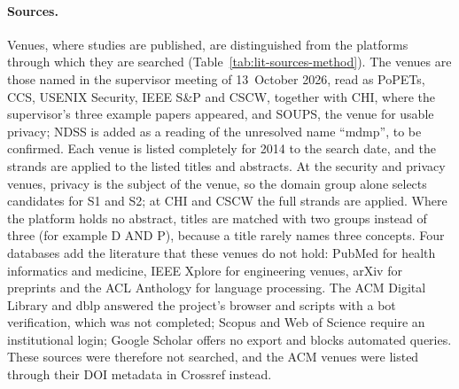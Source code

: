\paragraph{Sources.} Venues, where studies are published, are distinguished from
the platforms through which they are searched (Table~\ref{tab:lit-sources-method}).
The venues are those named in the supervisor meeting of 13~October 2026, read
as PoPETs, CCS, USENIX Security, IEEE S\&P and CSCW, together with CHI, where
the supervisor's three example papers appeared, and SOUPS, the venue for usable
privacy; NDSS is added as a reading of the unresolved name \enquote{mdmp}, to be
confirmed. Each venue is listed completely for 2014 to the search date, and the
strands are applied to the listed titles and abstracts. At the security and
privacy venues, privacy is the subject of the venue, so the domain group alone
selects candidates for S1 and S2; at CHI and CSCW the full strands are applied.
Where the platform holds no abstract, titles are matched with two groups
instead of three (for example D AND P), because a title rarely names three
concepts. Four databases add the literature that these venues do not hold:
PubMed for health informatics and medicine, IEEE Xplore for engineering
venues, arXiv for preprints and the ACL Anthology for language processing.
The ACM Digital Library and dblp answered the project's browser and scripts with a
bot verification, which was not completed; Scopus and Web of Science require an
institutional login; Google Scholar offers no export and blocks automated
queries. These sources were therefore not searched, and the ACM venues were
listed through their DOI metadata in Crossref instead.

